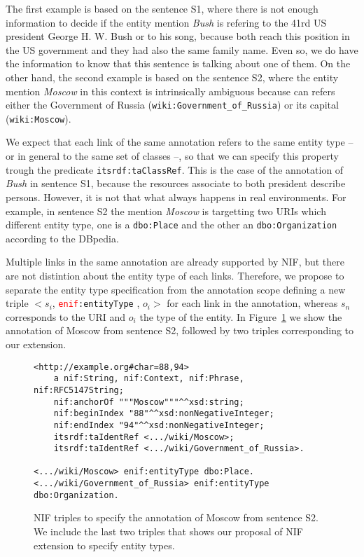 \documentclass{llncs}
\begin{document}
The first example is based on the sentence S1, where there is not enough information to decide if the entity mention \textit{Bush} is refering to the 41rd US president George H. W. Bush or to his song, because both reach this position in the US government and they had also the same family name. Even so, we do have the information to know that this sentence is talking about one of them. On the other hand, the second example is based on the sentence S2, where the entity mention \textit{Moscow} in this context is intrinsically ambiguous because can refers either the Government of Russia (\texttt{wiki:Government\_of\_Russia}) or its capital (\texttt{wiki:Moscow}). 


We expect that each link of the same annotation refers to the same entity type -- or in general to the same set of classes --, so that we can specify this property trough the predicate \texttt{itsrdf:taClassRef}. This is the case of the annotation of \textit{Bush} in sentence S1, because the resources associate to both president describe persons. However, it is not that what always happens in real environments. For example, in sentence S2 the mention \textit{Moscow} is targetting two URIs which different entity type, one is a \texttt{dbo:Place} and the other an \texttt{dbo:Organization} according to the DBpedia. 

Multiple links in the same annotation are already supported by NIF, but there are not distintion about the entity type of each links. Therefore, we propose to separate the entity type specification from the annotation scope defining a new triple $<s_i$, \texttt{\textcolor{red}{enif}:entityType} , $o_i>$ for each link in the annotation, whereas $s_n$ corresponds to the URI and $o_i$ the type of the entity. In Figure~\ref{fig:nif} we show the annotation of Moscow from sentence S2, followed by two triples corresponding to our extension. 

\begin{figure}
\caption{NIF triples to specify the annotation of Moscow from sentence S2. We include the last two triples that shows our proposal of NIF extension to specify entity types.}
\label{fig:nif}
\begin{Verbatim}[frame=single]
<http://example.org#char=88,94>
    a nif:String, nif:Context, nif:Phrase, nif:RFC5147String;
    nif:anchorOf """Moscow"""^^xsd:string;
    nif:beginIndex "88"^^xsd:nonNegativeInteger;
    nif:endIndex "94"^^xsd:nonNegativeInteger;
    itsrdf:taIdentRef <.../wiki/Moscow>;
    itsrdf:taIdentRef <.../wiki/Government_of_Russia>.  
    
<.../wiki/Moscow> enif:entityType dbo:Place.
<.../wiki/Government_of_Russia> enif:entityType dbo:Organization.
\end{Verbatim}
\end{figure}
\end{document}
